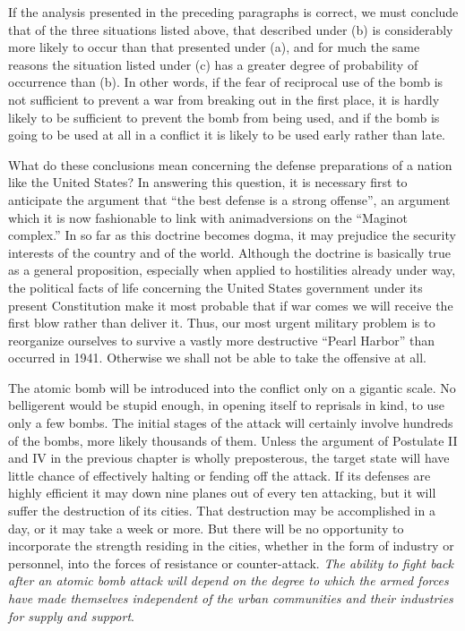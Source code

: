 If the analysis presented in the preceding paragraphs is correct, we must conclude that of the three situations listed above, that described under (b) is considerably more likely to occur than that presented under (a), and for much the same reasons the situation listed under (c) has a greater degree of probability of occurrence than (b). In other words, if the fear of reciprocal use of the bomb is not sufficient to prevent a war from breaking out in the first place, it is hardly likely to be sufficient to prevent the bomb from being used, and if the bomb is going to be used at all in a conflict it is likely to be used early rather than late.

What do these conclusions mean concerning the defense preparations of a nation like the United States? In answering this question, it is necessary first to anticipate the argument that ``the best defense is a strong offense'', an argument which it is now fashionable to link with animadversions on the ``Maginot complex.'' In so far as this doctrine becomes dogma, it may prejudice the security interests of the country and of the world. Although the doctrine is basically true as a general proposition, especially when applied to hostilities already under way, the political facts of life concerning the United States government under its present Constitution make it most probable that if war comes we will receive the first blow rather than deliver it. Thus, our most urgent military problem is to reorganize ourselves to survive a vastly more destructive ``Pearl Harbor'' than occurred in 1941. Otherwise we shall not be able to take the offensive at all.

\label{II-Retaliation3}

The atomic bomb will be introduced into the conflict only on a gigantic scale. No belligerent would be stupid enough, in opening itself to reprisals in kind, to use only a few bombs. The initial stages of the attack will certainly involve hundreds of the bombs, more likely thousands of them. Unless the argument of Postulate II and IV in the previous chapter is wholly preposterous, the target state will have little chance of effectively halting or fending off the attack. If its defenses are highly efficient it may down nine planes out of every ten attacking, but it will suffer the destruction of its cities. That destruction may be accomplished in a day, or it may take a week or more. But there will be no opportunity to incorporate the strength residing in the cities, whether in the form of industry or personnel, into the forces of resistance or counter-attack. \emph{The ability to fight back after an atomic bomb attack will depend on the degree to which the armed forces have made themselves independent of the urban communities and their industries for supply and support}.

